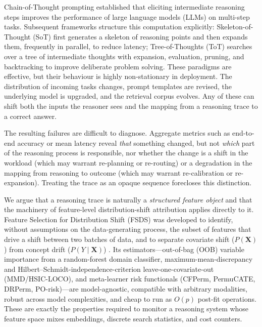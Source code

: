 \documentclass[11pt]{article}
\newcommand{\X}{\mathbf{X}}
\begin{document}
Chain-of-Thought prompting \cite{wei2022cot} established that eliciting
intermediate reasoning steps improves the performance of large language models
(LLMs) on multi-step tasks. Subsequent frameworks structure this computation
explicitly: Skeleton-of-Thought (SoT) \cite{ning2024sot} first generates a
skeleton of reasoning points and then expands them, frequently in parallel, to
reduce latency; Tree-of-Thoughts (ToT) \cite{yao2023tot} searches over a tree of
intermediate thoughts with expansion, evaluation, pruning, and backtracking to
improve deliberate problem solving. These paradigms are effective, but their
behaviour is highly non-stationary in deployment. The distribution of incoming
tasks changes, prompt templates are revised, the underlying model is upgraded,
and the retrieval corpus evolves. Any of these can shift both the inputs the
reasoner sees and the mapping from a reasoning trace to a correct answer.

The resulting failures are difficult to diagnose. Aggregate metrics such as
end-to-end accuracy or mean latency reveal \emph{that} something changed, but not
\emph{which} part of the reasoning process is responsible, nor whether the change
is a shift in the workload (which may warrant re-planning or re-routing) or a
degradation in the mapping from reasoning to outcome (which may warrant
re-calibration or re-expansion). Treating the trace as an opaque sequence
forecloses this distinction.

We argue that a reasoning trace is naturally a \emph{structured feature object}
and that the machinery of feature-level distribution-shift attribution applies
directly to it. Feature Selection for Distribution Shift (FSDS) was developed to
identify, without assumptions on the data-generating process, the subset of
features that drive a shift between two batches of data, and to separate
covariate shift ($P(\X)$) from concept drift ($P(Y\mid\X)$)
\cite{fsds2026}. Its estimators---out-of-bag (OOB) variable importance from a
random-forest domain classifier, maximum-mean-discrepancy and
Hilbert--Schmidt-independence-criterion leave-one-covariate-out (MMD/HSIC-LOCO),
and meta-learner risk functionals (CFPerm, PermuCATE, DRPerm, PO-risk)---are
model-agnostic, compatible with arbitrary modalities, robust across model
complexities, and cheap to run as $O(p)$ post-fit operations. These are exactly
the properties required to monitor a reasoning system whose feature space mixes
embeddings, discrete search statistics, and cost counters.
\end{document}
